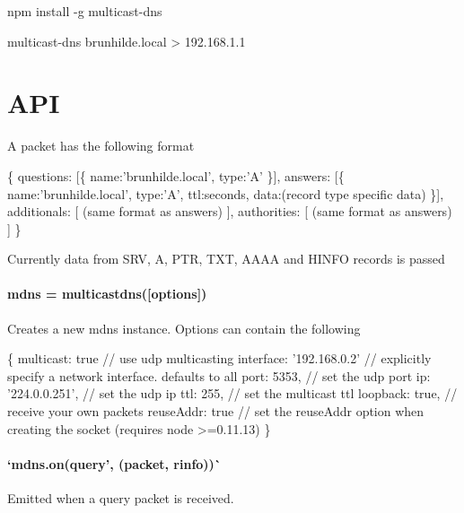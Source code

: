 \begin{DoxyCode}
npm install -g multicast-dns
\end{DoxyCode}



\begin{DoxyCode}
multicast-dns brunhilde.local
> 192.168.1.1
\end{DoxyCode}


\section*{A\+PI}

A packet has the following format


\begin{DoxyCode}
\{
  questions: [\{
    name:'brunhilde.local',
    type:'A'
  \}],
  answers: [\{
    name:'brunhilde.local',
    type:'A',
    ttl:seconds,
    data:(record type specific data)
  \}],
  additionals: [
    (same format as answers)
  ],
  authorities: [
    (same format as answers)
  ]
\}
\end{DoxyCode}


Currently data from {\ttfamily S\+RV}, {\ttfamily A}, {\ttfamily P\+TR}, {\ttfamily T\+XT}, {\ttfamily A\+A\+AA} and {\ttfamily H\+I\+N\+FO} records is passed

\paragraph*{{\ttfamily mdns = multicastdns(\mbox{[}options\mbox{]})}}

Creates a new {\ttfamily mdns} instance. Options can contain the following


\begin{DoxyCode}
\{
  multicast: true // use udp multicasting
  interface: '192.168.0.2' // explicitly specify a network interface. defaults to all
  port: 5353, // set the udp port
  ip: '224.0.0.251', // set the udp ip
  ttl: 255, // set the multicast ttl
  loopback: true, // receive your own packets
  reuseAddr: true // set the reuseAddr option when creating the socket (requires node >=0.11.13)
\}
\end{DoxyCode}


\paragraph*{`mdns.\+on(\textquotesingle{}query', (packet, rinfo))\`{}}

Emitted when a query packet is received.


